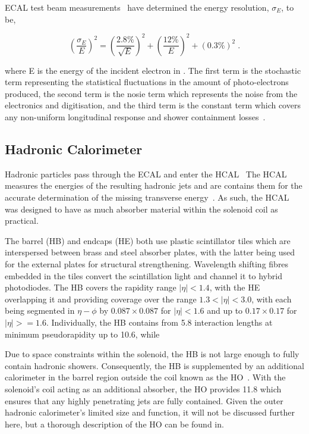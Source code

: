 ECAL test beam measurements~\cite{Adzic:2007mi} have determined the energy resolution, $\sigma_{E}$, to be,

\begin{equation}
(\frac{\sigma_{E}}{E})^{2} = (\frac{2.8\%}{\sqrt{E}})^{2} + (\frac{12\%}{E})^{2} + (0.3\%)^{2} \;.
\label{eq:ecalResolution}
\end{equation}

where E is the energy of the incident electron in \GeV. 
The first term is the stochastic term representing the statistical fluctuations in the amount of photo-electrons produced, the second term is the nosie term which represents the noise from the electronics and digitisation, and the third term is the constant term which covers any non-uniform longitudinal response and shower containment losses~\cite{Adzic:2007mi}.

\subsection{Hadronic Calorimeter}\label{subsec:HCAL}
Hadronic particles pass through the ECAL and enter the HCAL~\cite{CMS:1997xji}
The HCAL measures the energies of the resulting hadronic jets and are contains them for the accurate determination of the missing transverse energy~\cite{HCAL:tdr}.
As such, the HCAL was designed to have as much absorber material within the solenoid coil as practical. 

The barrel (HB) and endcaps (HE) both use plastic scintillator tiles which are interspersed between brass and steel absorber plates, with the latter being used for the external plates for structural strengthening.
Wavelength shifting fibres embedded in the tiles convert the scintillation light and channel it to hybrid photodiodes.
The HB covers the rapidity range $|\eta| < 1.4$, with the HE overlapping it and providing coverage over the range $1.3 < |\eta| < 3.0$, with each being segmented in $\eta - \phi$ by $0.087 \times 0.087$ for $| \eta | < 1.6$ and up to $0.17 \times 0.17$ for $| \eta | >= 1.6$.
Individually, the HB contains from 5.8 interaction lengths at minimum pseudorapidity up to 10.6, while 

Due to space constraints within the solenoid, the HB is not large enough to fully contain hadronic showers. Consequently, the HB is supplemented by an additional calorimeter in the barrel region outside the coil known as the HO~\cite{HO}. 
With the solenoid's coil acting as an additional absorber, the HO provides 11.8
which ensures that any highly penetrating jets are fully contained.
Given the outer hadronic calorimeter's limited size and function, it will not be discussed further here, but 
a thorough description of the HO can be found in.

